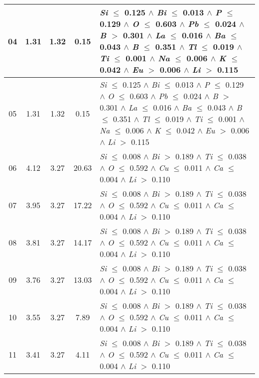 \begin{table}[!htbp]
\begin{tabular}{ccccm{}}
		\hline
		04 & 1.31 & 1.32 & 0.15 & \textit{Si} $\le$ 0.125 $\wedge$ \textit{Bi} $\le$ 0.013 $\wedge$ \textit{P} $\le$ 0.129 $\wedge$ \textit{O} $\le$ 0.603 $\wedge$ \textit{Pb} $\le$ 0.024 $\wedge$ \textit{B} $>$ 0.301 $\wedge$ \textit{La} $\le$ 0.016 $\wedge$ \textit{Ba} $\le$ 0.043 $\wedge$ \textit{B} $\le$ 0.351 $\wedge$ \textit{Tl} $\le$ 0.019 $\wedge$ \textit{Ti} $\le$ 0.001 $\wedge$ \textit{Na} $\le$ 0.006 $\wedge$ \textit{K} $\le$ 0.042 $\wedge$ \textit{Eu} $>$ 0.006 $\wedge$ \textit{Li} $>$ 0.115\\
		\hline
		05 & 1.31 & 1.32 & 0.15 & \textit{Si} $\le$ 0.125 $\wedge$ \textit{Bi} $\le$ 0.013 $\wedge$ \textit{P} $\le$ 0.129 $\wedge$ \textit{O} $\le$ 0.603 $\wedge$ \textit{Pb} $\le$ 0.024 $\wedge$ \textit{B} $>$ 0.301 $\wedge$ \textit{La} $\le$ 0.016 $\wedge$ \textit{Ba} $\le$ 0.043 $\wedge$ \textit{B} $\le$ 0.351 $\wedge$ \textit{Tl} $\le$ 0.019 $\wedge$ \textit{Ti} $\le$ 0.001 $\wedge$ \textit{Na} $\le$ 0.006 $\wedge$ \textit{K} $\le$ 0.042 $\wedge$ \textit{Eu} $>$ 0.006 $\wedge$ \textit{Li} $>$ 0.115\\
		\hline
		06 & 4.12 & 3.27 & 20.63 & \textit{Si} $\le$ 0.008 $\wedge$ \textit{Bi} $>$ 0.189 $\wedge$ \textit{Ti} $\le$ 0.038 $\wedge$ \textit{O} $\le$ 0.592 $\wedge$ \textit{Cu} $\le$ 0.011 $\wedge$ \textit{Ca} $\le$ 0.004 $\wedge$ \textit{Li} $>$ 0.110\\
		\hline
		07 & 3.95 & 3.27 & 17.22 & \textit{Si} $\le$ 0.008 $\wedge$ \textit{Bi} $>$ 0.189 $\wedge$ \textit{Ti} $\le$ 0.038 $\wedge$ \textit{O} $\le$ 0.592 $\wedge$ \textit{Cu} $\le$ 0.011 $\wedge$ \textit{Ca} $\le$ 0.004 $\wedge$ \textit{Li} $>$ 0.110\\
		\hline
		08 & 3.81 & 3.27 & 14.17 & \textit{Si} $\le$ 0.008 $\wedge$ \textit{Bi} $>$ 0.189 $\wedge$ \textit{Ti} $\le$ 0.038 $\wedge$ \textit{O} $\le$ 0.592 $\wedge$ \textit{Cu} $\le$ 0.011 $\wedge$ \textit{Ca} $\le$ 0.004 $\wedge$ \textit{Li} $>$ 0.110\\
		\hline
		09 & 3.76 & 3.27 & 13.03 & \textit{Si} $\le$ 0.008 $\wedge$ \textit{Bi} $>$ 0.189 $\wedge$ \textit{Ti} $\le$ 0.038 $\wedge$ \textit{O} $\le$ 0.592 $\wedge$ \textit{Cu} $\le$ 0.011 $\wedge$ \textit{Ca} $\le$ 0.004 $\wedge$ \textit{Li} $>$ 0.110\\
		\hline
		10 & 3.55 & 3.27 & 7.89 & \textit{Si} $\le$ 0.008 $\wedge$ \textit{Bi} $>$ 0.189 $\wedge$ \textit{Ti} $\le$ 0.038 $\wedge$ \textit{O} $\le$ 0.592 $\wedge$ \textit{Cu} $\le$ 0.011 $\wedge$ \textit{Ca} $\le$ 0.004 $\wedge$ \textit{Li} $>$ 0.110\\
		\hline
		11 & 3.41 & 3.27 & 4.11 & \textit{Si} $\le$ 0.008 $\wedge$ \textit{Bi} $>$ 0.189 $\wedge$ \textit{Ti} $\le$ 0.038 $\wedge$ \textit{O} $\le$ 0.592 $\wedge$ \textit{Cu} $\le$ 0.011 $\wedge$ \textit{Ca} $\le$ 0.004 $\wedge$ \textit{Li} $>$ 0.110\\
		\bottomrule
	\end{tabular}
\end{table}
